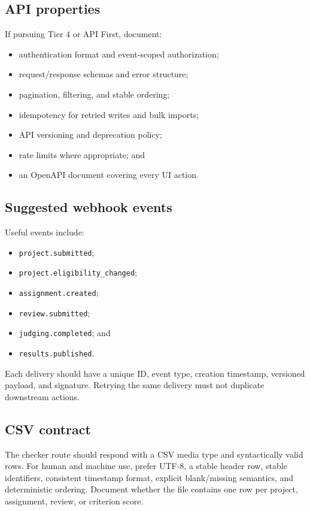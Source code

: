 \documentclass[11pt]{article}
\begin{document}
\subsection{API properties}

If pursuing Tier 4 or API First, document:

\begin{itemize}
  \item authentication format and event-scoped authorization;
  \item request/response schemas and error structure;
  \item pagination, filtering, and stable ordering;
  \item idempotency for retried writes and bulk imports;
  \item API versioning and deprecation policy;
  \item rate limits where appropriate; and
  \item an OpenAPI document covering every UI action.
\end{itemize}

\subsection{Suggested webhook events}

Useful events include:

\begin{itemize}
  \item \texttt{project.submitted};
  \item \texttt{project.eligibility\_changed};
  \item \texttt{assignment.created};
  \item \texttt{review.submitted};
  \item \texttt{judging.completed}; and
  \item \texttt{results.published}.
\end{itemize}

Each delivery should have a unique ID, event type, creation timestamp, versioned payload, and signature. Retrying the same delivery must not duplicate downstream actions.

\subsection{CSV contract}

The checker route should respond with a CSV media type and syntactically valid rows. For human and machine use, prefer UTF-8, a stable header row, stable identifiers, consistent timestamp format, explicit blank/missing semantics, and deterministic ordering. Document whether the file contains one row per project, assignment, review, or criterion score.
\end{document}
